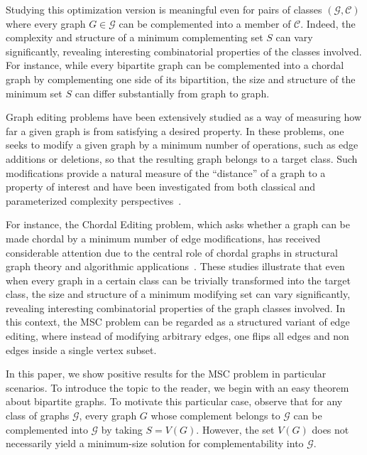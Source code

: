 \documentclass[11pt]{article}
\theoremstyle{definition}
\begin{document}
Studying this optimization version is meaningful even for pairs of classes $(\mathcal{G}, \mathcal{C})$ where every graph $G \in \mathcal{G}$ can be complemented into a member of $\mathcal{C}$.  
Indeed, the complexity and structure of a minimum complementing set $S$ can vary significantly, revealing interesting combinatorial properties of the classes involved.  
For instance, while every bipartite graph can be complemented into a chordal graph by complementing one side of its bipartition, the size and structure of the minimum set $S$ can differ substantially from graph to graph.

Graph editing problems have been extensively studied as a way of measuring how far a given graph is from satisfying a desired property. 
In these problems, one seeks to modify a given graph by a minimum number of operations, such as edge additions or deletions, so that the resulting graph belongs to a target class. 
Such modifications provide a natural measure of the ``distance'' of a graph to a property of interest and have been investigated from both classical and parameterized complexity perspectives~\cite{AlonShapiraSudakov2005,CrespelleDrangeFominGolovach2023,DzidoKrzywdzinski2015,Liu2015EdgeDeletion,NatanzonShamirSharan2001}. 

For instance, the Chordal Editing problem, which asks whether a graph can be made chordal by a minimum number of edge modifications, has received considerable attention due to the central role of chordal graphs in structural graph theory and algorithmic applications~\cite{CaoMarx2014}. 
These studies illustrate that even when every graph in a certain class can be trivially transformed into the target class, the size and structure of a minimum modifying set can vary significantly, revealing interesting combinatorial properties of the graph classes involved.
In this context, the MSC problem can be regarded as a structured variant of edge editing, where instead of modifying arbitrary edges, one flips all edges and non edges inside a single vertex subset.


In this paper, we show positive results for the MSC problem in particular scenarios. 
To introduce the topic to the reader, we begin with an easy theorem about bipartite graphs. 
To motivate this particular case, observe that for any class of graphs $\mathcal{G}$, 
every graph $G$ whose complement belongs to $\mathcal{G}$ can be complemented into $\mathcal{G}$ 
by taking $S = V(G)$. However, the set $V(G)$ does not necessarily yield a minimum-size solution 
for complementability into $\mathcal{G}$.
\end{document}
